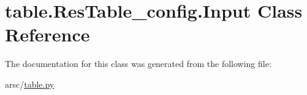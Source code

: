 \hypertarget{classtable_1_1ResTable__config_1_1Input}{}\section{table.\+Res\+Table\+\_\+config.\+Input Class Reference}
\label{classtable_1_1ResTable__config_1_1Input}


The documentation for this class was generated from the following file\+:\begin{DoxyCompactItemize}
\item 
arsc/\mbox{\hyperlink{table_8py}{table.\+py}}\end{DoxyCompactItemize}
